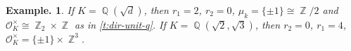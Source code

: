 \documentclass[11pt, a4paper]{memoir}
\DeclareMathOperator{\Q}{{\mathbb{Q}}}
\DeclareMathOperator{\Z}{{\mathbb{Z}}}
\theoremstyle{change}
\theoremstyle{plain}
\theoremstyle{nonumberplain}
\newtheorem{example}{Example.}
\DeclareMathOperator{\disc}{disc}
\numberwithin{equation}{section}
\begin{document}
\begin{example}
    If $K=\Q(\sqrt{d})$, then $r_1=2$, $r_2=0$, $\mu_k=\{\pm 1\}\cong\Z/2$ and $\mathcal{O}_K^\times\cong\Z_2\times\Z$ as in \cref{t:dir-unit-q}.
    If $K=\Q(\sqrt{2},\sqrt{3})$, then $r_2=0$, $r_1=4$, $\mathcal{O}_K^\times=\{\pm 1\}\times\Z^3$.
\end{example}





\end{document}
